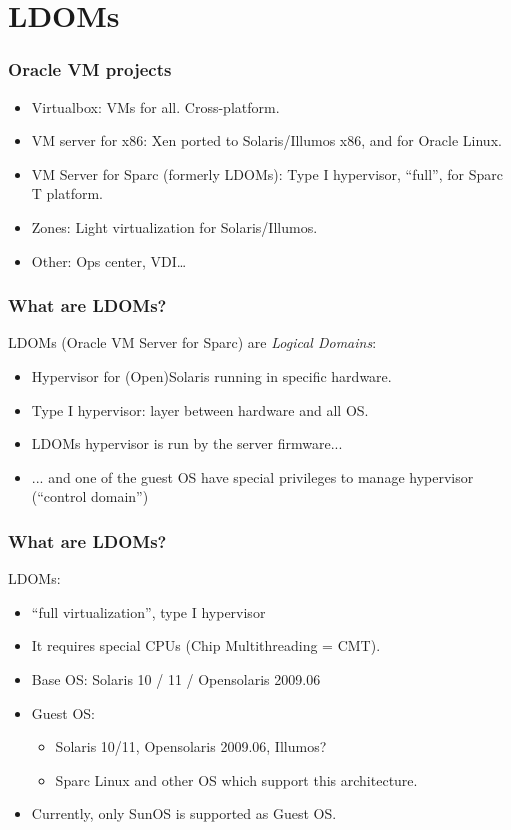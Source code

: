 \documentclass{beamer}
\begin{document}
\section{LDOMs}

\begin{frame}
\frametitle{Oracle VM projects}

\begin{itemize}
\item Virtualbox: \pause VMs for all. Cross-platform.\pause
\item VM server for x86: \pause Xen ported to Solaris/Illumos x86, and for Oracle Linux.\pause
\item VM Server for Sparc (formerly LDOMs): \pause Type I hypervisor, ``full'', for Sparc T platform.\pause
\item Zones: \pause Light virtualization for Solaris/Illumos.\pause
\item Other: \pause Ops center, VDI\ldots
\end{itemize}

\end{frame}

\begin{frame}
\frametitle{What are LDOMs?}

LDOMs (Oracle VM Server for Sparc) are {\em Logical Domains}:
\pause
\begin{itemize}
\item Hypervisor for (Open)Solaris running in specific hardware.
\pause
\item Type I hypervisor: layer between hardware and all OS.
\pause
\item LDOMs hypervisor is run by the server firmware...
\pause
\item ... and one of the guest OS have special privileges to manage hypervisor (``control domain'')
\end{itemize}

\end{frame}

\begin{frame}
\frametitle{What are LDOMs?}

LDOMs:
\pause
\begin{itemize}
\item ``full virtualization'', type I hypervisor\pause
\item It requires special CPUs (Chip Multithreading = CMT).\pause
\item Base OS: Solaris 10 / 11 / Opensolaris 2009.06\pause
\item Guest OS:\pause
\begin{itemize}
\item Solaris 10/11, Opensolaris 2009.06, Illumos?\pause
\item Sparc Linux and other OS which support this architecture.\pause
\end{itemize}
\item Currently, only SunOS is supported as Guest OS.
\end{itemize}

\end{frame}
\end{document}
